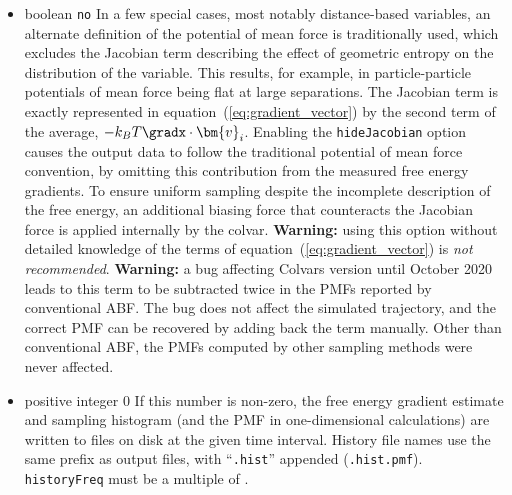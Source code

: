 \begin{itemize}
\item {}
  {boolean}
  {\texttt{no}}
  {In a few special cases, most notably distance-based variables, an alternate definition of
    the potential of mean force is traditionally used, which excludes the Jacobian
    term describing the effect of geometric entropy on the distribution of the variable.
    This results, for example, in particle-particle potentials of mean force being flat
    at large separations.
    The Jacobian term is exactly represented in equation~(\ref{eq:gradient_vector}) by the second term
    of the average, $ - k_B T \gradx \cdot \bm{v}_{i} $.
    Enabling the \texttt{hideJacobian} option causes the output data to follow the traditional
    potential of mean force convention,
    by omitting this contribution from the measured free energy gradients.
    To ensure uniform sampling despite the incomplete description of the free energy, an
    additional biasing force that counteracts the Jacobian force is applied internally by the
    colvar.
    \textbf{Warning:} using this option without detailed knowledge of the terms of equation~(\ref{eq:gradient_vector}) is \emph{not recommended}.
    \textbf{Warning:} a bug affecting Colvars version until October 2020 leads to this term to be subtracted twice in the PMFs reported by conventional ABF.
    The bug does not affect the simulated trajectory, and the correct PMF can be recovered by adding back the term manually.
    Other than conventional ABF, the PMFs computed by other sampling methods were never affected.}

\item {}
  {positive integer}
  {0}
  {If this number is non-zero, the free energy gradient estimate and sampling histogram
    (and the PMF in one-dimensional calculations) are written to files on disk at
    the given time interval. History file names use the same prefix as output files, with
    ``\texttt{.hist}'' appended (\outputName\texttt{.hist.pmf}).
  \texttt{historyFreq} must be a multiple of .}


\end{itemize}
